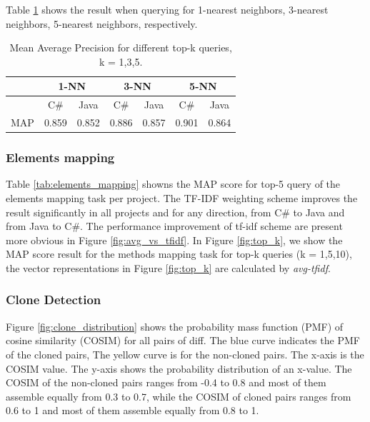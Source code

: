 Table \ref{tab:tokens_matching_top_k} shows the result when querying for 1-nearest neighbors, 3-nearest neighbors, 5-nearest neighbors, respectively.

\begin{table}
	

	
	\begin{tabular}{c|cc|cc|cc}
		
		\hline
		\multicolumn{1}{c}{}  &
		\multicolumn{2}{c}{1-NN}  &
		\multicolumn{2}{c}{3-NN}  & \multicolumn{2}{c}{5-NN} \\
		\hline
		& C\# & Java & C\# & Java & C\# & Java \\
		\hline
		MAP & 0.859 & 0.852 & 0.886 & 0.857 & 0.901 & 0.864 \\    
		
	\end{tabular}
	
	\medskip  
	\caption{Mean Average Precision for different top-k queries, k = 1,3,5. } 
		\label{tab:tokens_matching_top_k}
\end{table}


\subsubsection{Elements mapping}

Table \ref{tab:elements_mapping} showns the MAP score for top-5 query of the elements mapping task per project. The TF-IDF weighting scheme improves the result significantly in all projects and for any direction, from C\# to Java and from Java to C\#. The performance improvement of tf-idf scheme are present more obvious in Figure \ref{fig:avg_vs_tfidf}. In Figure \ref{fig:top_k}, we show the MAP score result for the methods mapping task for top-k queries (k = 1,5,10), the vector representations in Figure \ref{fig:top_k} are calculated by \textit{avg-tfidf}.








\subsubsection{Clone Detection}
Figure \ref{fig:clone_distribution} shows the probability mass function (PMF) of cosine similarity (COSIM) for all pairs of diff. The blue curve indicates the PMF of the cloned pairs, The yellow curve is for the non-cloned pairs. The x-axis is the COSIM value. The y-axis shows the probability distribution of an x-value. The COSIM of the non-cloned pairs ranges from -0.4 to 0.8 and most of them assemble equally from 0.3 to 0.7, while the COSIM of cloned pairs ranges from 0.6 to 1 and most of them assemble equally from 0.8 to 1.


